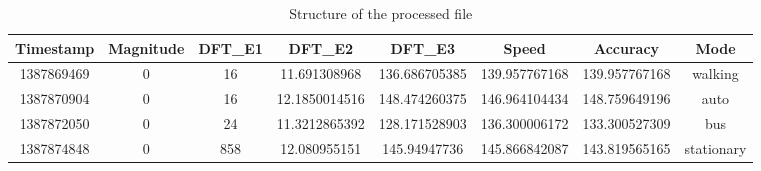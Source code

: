 \begin{table*}[ht]
	\centering
	\caption{Structure of the processed file\label{tab:sample_csv}}
  	\begin{tabular}{ |c|c|c|c|c|c|c|c|}
    	\hline
	    \textbf{Timestamp} & \textbf{Magnitude} & \textbf{DFT\_E1} & \textbf{DFT\_E2} & \textbf{DFT\_E3} & \textbf{Speed} & \textbf{Accuracy} & \textbf{Mode} \\ \hline
	    1387869469 & 0 & 16 & 11.691308968 & 136.686705385 & 139.957767168 & 139.957767168 & walking \\ \hline
		1387870904 & 0 & 16 & 12.1850014516 & 148.474260375 & 146.964104434 & 148.759649196 & auto \\ \hline
		1387872050 & 0 & 24 & 11.3212865392 & 128.171528903 & 136.300006172 & 133.300527309 & bus \\ \hline
		1387874848 & 0 & 858 & 12.080955151 & 145.94947736 & 145.866842087 & 143.819565165 & stationary \\
	    \hline
  	\end{tabular}
\end{table*}